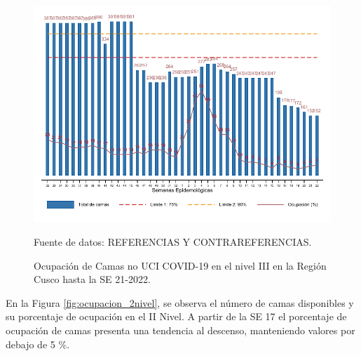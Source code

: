\documentclass[12pt,a4paper,openany]{book}
\begin{document}
	
	\begin{figure}[htpb]
		\caption{Ocupación de Camas no UCI COVID-19 en el nivel III en la Región Cusco hasta la SE 21-2022.}\label{fig:ocupacion_3_nivel}
		\begin{center}
			\includegraphics[width=0.95\linewidth]{../figuras/nivel_3.pdf}
		\end{center}
		{\footnotesize {Fuente de datos: REFERENCIAS Y CONTRAREFERENCIAS.}}
	\end{figure}
	
	\clearpage
	
	En la Figura \ref{fig:ocupacion_2nivel}, se observa el número de camas disponibles y su porcentaje de ocupación en el II Nivel. A partir de la SE 17 el porcentaje de ocupación de camas presenta una tendencia al descenso, manteniendo valores por debajo de 5 $\%$.
	
\end{document}
